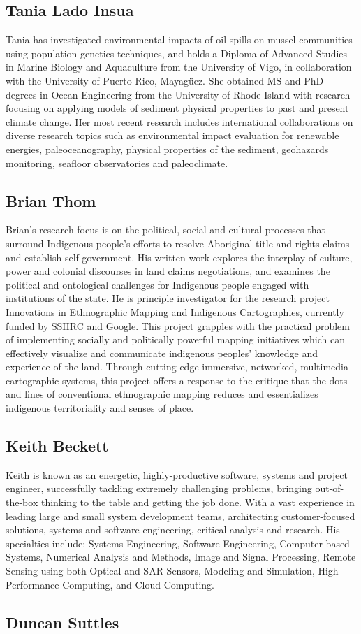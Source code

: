 \subsection*{Tania Lado Insua}
Tania has investigated environmental impacts of oil-spills on mussel communities using population genetics techniques, and holds a Diploma of Advanced Studies in Marine Biology and Aquaculture from the University of Vigo, in collaboration with the University of Puerto Rico, Mayagüez.  She obtained MS and PhD degrees in Ocean Engineering from the University of Rhode Island with research focusing on applying models of sediment physical properties to past and present climate change. Her most recent research includes international collaborations on diverse research topics such as environmental impact evaluation for renewable energies, paleoceanography, physical properties of the sediment, geohazards monitoring, seafloor observatories and paleoclimate. 


\subsection*{Brian Thom}
Brian’s research focus is on the political, social and cultural processes that surround Indigenous people's efforts to resolve Aboriginal title and rights claims and establish self-government.  His written work explores the interplay of culture, power and colonial discourses in land claims negotiations, and examines the political and ontological challenges for Indigenous people engaged with institutions of the state.  He is principle investigator for the research project Innovations in Ethnographic Mapping and Indigenous Cartographies, currently funded by SSHRC and Google. This project grapples with the practical problem of implementing socially and politically powerful mapping initiatives which can effectively visualize and communicate indigenous peoples’ knowledge and experience of the land. Through cutting-edge immersive, networked, multimedia cartographic systems, this project offers a response to the critique that the dots and lines of conventional ethnographic mapping reduces and essentializes indigenous territoriality and senses of place.



\subsection*{Keith Beckett}
Keith is known as an energetic, highly-productive software, systems and project engineer, successfully tackling extremely challenging problems, bringing out-of-the-box thinking to the table and getting the job done. With a vast experience in leading large and small system development teams, architecting customer-focused solutions, systems and software engineering, critical analysis and research.  His specialties include: Systems Engineering, Software Engineering, Computer-based Systems, Numerical Analysis and Methods, Image and Signal Processing, Remote Sensing using both Optical and SAR Sensors, Modeling and Simulation, High-Performance Computing, and Cloud Computing.

\subsection*{Duncan Suttles}
